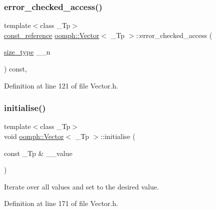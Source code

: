 \subsubsection{\texorpdfstring{error\+\_\+checked\+\_\+access()}{error\_checked\_access()}\hspace{0.1cm}{\footnotesize\ttfamily [2/2]}}
{\footnotesize\ttfamily template$<$class \+\_\+\+Tp$>$ \\
\hyperlink{classoomph_1_1Vector_ad126afbb3b115ef9dce224cf33c71428}{const\+\_\+reference} \hyperlink{classoomph_1_1Vector}{oomph\+::\+Vector}$<$ \+\_\+\+Tp $>$\+::error\+\_\+checked\+\_\+access (\begin{DoxyParamCaption}\item[{\hyperlink{classoomph_1_1Vector_a8ad2a43bd51f6bf2a981dd4e4e4247f5}{size\+\_\+type}}]{\+\_\+\+\_\+n }\end{DoxyParamCaption}) const\hspace{0.3cm}{\ttfamily [inline]}, {\ttfamily [private]}}



Definition at line 121 of file Vector.\+h.

\mbox{\label{classoomph_1_1Vector_ad526bb1acccf11b485ebe12c9cde44fd}} 
\subsubsection{\texorpdfstring{initialise()}{initialise()}}
{\footnotesize\ttfamily template$<$class \+\_\+\+Tp$>$ \\
void \hyperlink{classoomph_1_1Vector}{oomph\+::\+Vector}$<$ \+\_\+\+Tp $>$\+::initialise (\begin{DoxyParamCaption}\item[{const \+\_\+\+Tp \&}]{\+\_\+\+\_\+value }\end{DoxyParamCaption})\hspace{0.3cm}{\ttfamily [inline]}}



Iterate over all values and set to the desired value. 



Definition at line 171 of file Vector.\+h.



